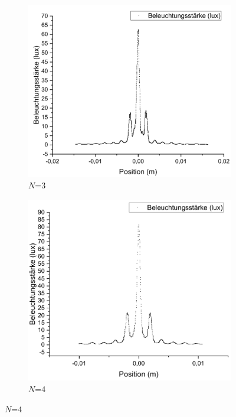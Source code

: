 \documentclass[
	a4paper,
	12pt,
	pagesize,
	ngerman
]{scrartcl}
\begin{document}
	\begin{figure}[H]
		\centering
		\begin{subfigure}{.5\textwidth}
			\centering
			\includegraphics[width=1\linewidth]{GitterN3ZOOM}
			\caption{$N$=3}	
		\end{subfigure}%
		\begin{subfigure}{.5\textwidth}
			\centering
			\includegraphics[width=1\linewidth]{GitterN4ZOOM}
			\caption{$N$=4}
		\end{subfigure}

\end{figure}
\end{document}

